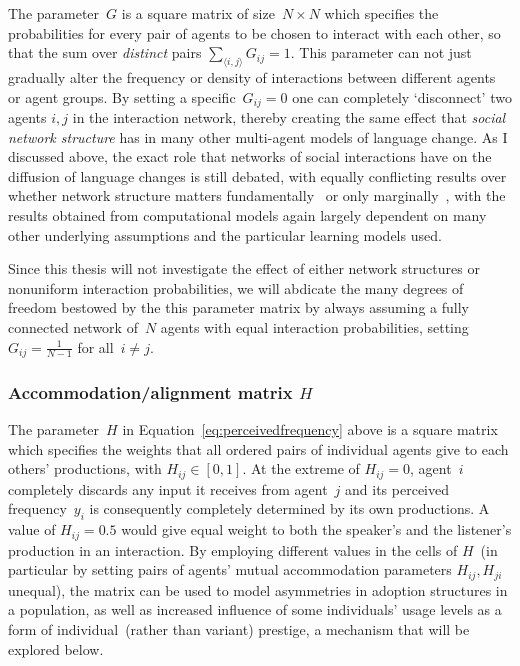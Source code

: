 The parameter~$G$ is a square matrix of size~$N\times N$ which specifies the probabilities for every pair of agents to be chosen to interact with each other, so that the sum over \emph{distinct} pairs $\sum_{\langle i,j\rangle}G_{ij}=1$. This parameter can not just gradually alter the frequency or density of interactions between different agents or agent groups. By setting a specific~$G_{ij}=0$ one can completely `disconnect' two agents $i,j$ in the interaction network, thereby creating the same effect that \emph{social network structure} has in many other multi-agent models of language change.
As I discussed above, the exact role that networks of social interactions have on the diffusion of language changes is still debated, with equally conflicting results over whether network structure matters fundamentally~\citep{Blythe2007divided,Fagyal2010,Gong2012,Pierrehumbert2014,Kauhanen2016} or only marginally~\citep{Nettle1999,Baxter2008,Blythe2009,Stadler2009}, with the results obtained from computational models again largely dependent on many other underlying assumptions and the particular learning models used.

Since this thesis will not investigate the effect of either network structures or nonuniform interaction probabilities, we will abdicate the many degrees of freedom bestowed by the this parameter matrix by always assuming a fully connected network of~$N$ agents with equal interaction probabilities, setting $G_{ij}=\frac{1}{N-1}$ for all~$i\ne j$.

\subsubsection{Accommodation/alignment matrix $H$}

The parameter~$H$ in Equation~\ref{eq:perceivedfrequency} above is a square matrix which specifies the weights that all ordered pairs of individual agents give to each others' productions, with $H_{ij} \in [0,1]$. At the extreme of $H_{ij}=0$, agent~$i$ completely discards any input it receives from agent~$j$ and its perceived frequency~$y_i$ is consequently completely determined by its own productions.
A value of $H_{ij}=0.5$ would give equal weight to both the speaker's and the listener's production in an interaction. By employing different values in the cells of $H$~(in particular by setting pairs of agents' mutual accommodation parameters $H_{ij}, H_{ji}$ unequal), the matrix can be used to model asymmetries in adoption structures in a population, as well as increased influence of some individuals' usage levels as a form of individual~(rather than variant) prestige, a mechanism that will be explored below.

